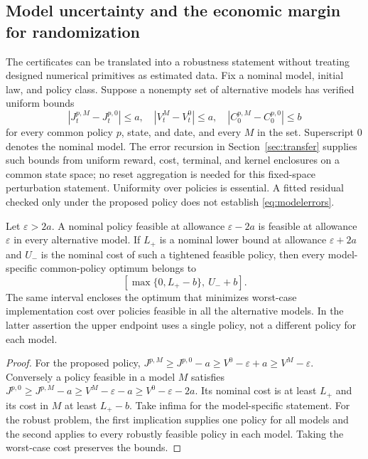 \subsection{Model uncertainty and the economic margin for randomization}\label{sec:robustmargin}
The certificates can be translated into a robustness statement without treating designed numerical primitives as estimated data. Fix a nominal model, initial law, and policy class. Suppose a nonempty set of alternative models has verified uniform bounds
\begin{equation}\label{eq:modelerrors}
 |J_t^{p,M}-J_t^{p,0}|\leq a,\quad |V_t^M-V_t^0|\leq a,
 \quad |C_0^{p,M}-C_0^{p,0}|\leq b
\end{equation}
for every common policy $p$, state, and date, and every $M$ in the set. Superscript 0 denotes the nominal model. The error recursion in Section~\ref{sec:transfer} supplies such bounds from uniform reward, cost, terminal, and kernel enclosures on a common state space; no reset aggregation is needed for this fixed-space perturbation statement. Uniformity over policies is essential. A fitted residual checked only under the proposed policy does not establish \eqref{eq:modelerrors}.

\begin{proposition}\label{prop:robust}
Let $\varepsilon>2a$. A nominal policy feasible at allowance $\varepsilon-2a$ is feasible at allowance $\varepsilon$ in every alternative model. If $L_+$ is a nominal lower bound at allowance $\varepsilon+2a$ and $U_-$ is the nominal cost of such a tightened feasible policy, then every model-specific common-policy optimum belongs to
\[
 [\max\{0,L_+-b\},\ U_-+b].
\]
The same interval encloses the optimum that minimizes worst-case implementation cost over policies feasible in all the alternative models. In the latter assertion the upper endpoint uses a single policy, not a different policy for each model.
\end{proposition}
\begin{proof}
For the proposed policy, $J^{p,M}\geq J^{p,0}-a\geq V^0-\varepsilon+a\geq V^M-\varepsilon$. Conversely a policy feasible in a model $M$ satisfies $J^{p,0}\geq J^{p,M}-a\geq V^M-\varepsilon-a\geq V^0-\varepsilon-2a$. Its nominal cost is at least $L_+$ and its cost in $M$ at least $L_+-b$. Take infima for the model-specific statement. For the robust problem, the first implication supplies one policy for all models and the second applies to every robustly feasible policy in each model. Taking the worst-case cost preserves the bounds.
\end{proof}


